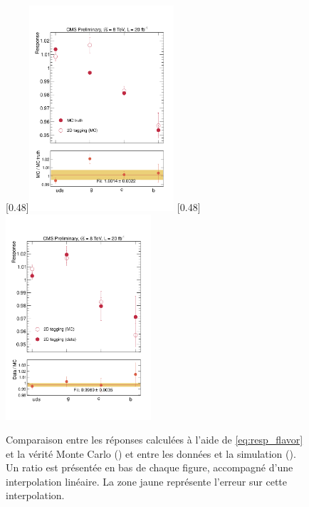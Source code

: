 \begin{figure}[tbp] \centering
    \subcaptionbox{\label{fig:2d_mc_vs_mc}}[0.48\textwidth]{\includegraphics[width=0.48\textwidth]{chapitre4/figs/flavor/Mean_ptPhot_100_800_withRatio_MC_MCtruth.pdf}}
    \subcaptionbox{\label{fig:flavor_results}}[0.48\textwidth]{\includegraphics[width=0.48\textwidth]{chapitre4/figs/flavor/Mean_ptPhot_100_800_withRatio_data_MC.pdf}}
    \caption{Comparaison entre les réponses calculées à l'aide de \ref{eq:resp_flavor} et la vérité Monte Carlo () et entre les données et la simulation (). Un ratio est présentée en bas de chaque figure, accompagné d'une interpolation linéaire. La zone jaune représente l'erreur sur cette interpolation.}
\end{figure}

\bigskip

